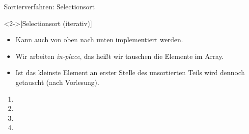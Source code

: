 \def\List#1#2{
    \foreach[count=\i,remember=\i as \li(initially 0)] \n in {#1}{
        \ifnum\i>#2
            \node[inner sep=4pt,ball,outer sep=2pt] (\i) at(1.25*\i,0) {\n};
        \else
            \node[inner sep=4pt,iball,outer sep=2pt] (\i) at(1.25*\i,0) {\n};
        \fi
        \ifnum\i>1
            \draw (\li.east) -- (\i.west);
        \fi
    }
}

\begin{frame}{Sortierverfahren: Selectionsort}
    \begin{definition}<2->[Selectionsort \hfill{}(iterativ)]
    \end{definition}
    \begin{itemize}
        \item<5-> Kann auch von oben nach unten implementiert werden.
        \item<6-> Wir arbeiten \emph{in-place}, das heißt wir tauschen die Elemente im Array.
        \item<7-> Ist das kleinste Element an erster Stelle des unsortierten Teils wird dennoch getauscht (nach Vorlesung).
    \end{itemize}
    \vfill
    \begin{center}
\begin{minipage}{0.9\linewidth}
\begin{multicols}{2}
    \begin{enumerate}
        \item<8-> 
        \item<9-> 
        \item<10-> 
        \item<11-> 
    \end{enumerate}
\end{multicols}
\end{minipage}
    \end{center}
\end{frame}


